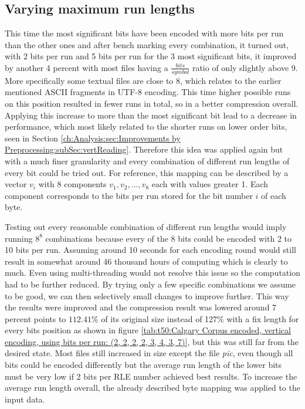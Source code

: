 \subsection{Varying maximum run lengths}
\label{ch:Conceptual Design:sec:var lengths}
\par{
This time the most significant bits have been encoded with more bits per run than the other ones and after bench marking every combination, it turned out, with 2 bits per run and 5 bits per run for the 3 most significant bits, it improved by another 4 percent with most files having a $\frac{bits}{symbol}$ ratio of only slightly above 9. More specifically some textual files are close to 8, which relates to the earlier mentioned ASCII fragments in UTF-8 encoding. This time higher possible runs on this position resulted in fewer runs in total, so in a better compression overall. Applying this increase to more than the most significant bit lead to a decrease in performance, which most likely related to the shorter runs on lower order bits, seen in Section \ref{ch:Analysis:sec:Improvements by Preprocessing:subSec:vertReading}. Therefore this idea was applied again but with a much finer granularity and every combination of different run lengths of every bit could be tried out. For reference, this mapping can be described by a vector $v_i$ with 8 components $v_1,v_2,...,v_8$ each with values greater 1. Each component corresponds to the bits per run stored for the bit number $i$ of each byte.
}
\par{
Testing out every reasonable combination of different run lengths would imply running $8^8$ combinations because every of the 8 bits could be encoded with 2 to 10 bits per run. Assuming around 10 seconds for each encoding round would still result in somewhat around 46 thousand hours of computing which is clearly to much. Even using multi-threading would not resolve this issue so the computation had to be further reduced. By trying only a few specific combinations we assume to be good, we can then selectively small changes to improve further. This way the results were improved and the compression result was lowered around 7 percent points to $112.41\%$ of its original size instead of 127\% with a fix length for every bits position as shown in figure \ref{tab:t50:Calgary Corpus encoded, vertical encoding, using bits per run: (2, 2, 2, 2, 3, 4, 3, 7)}, but this was still far from the desired state. Most files still increased in size except the file \textit{pic}, even though all bits could be encoded differently but the average run length of the lower bits must be very low if 2 bits per RLE number achieved best results. To increase the average run length overall, the already described byte mapping was applied to the input data.
}

